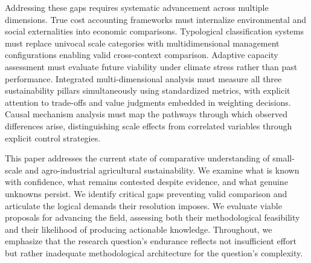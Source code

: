 \documentclass[12pt, a4paper]{article}
\begin{document}
Addressing these gaps requires systematic advancement across multiple dimensions. True cost accounting frameworks must internalize environmental and social externalities into economic comparisons. Typological classification systems must replace univocal scale categories with multidimensional management configurations enabling valid cross-context comparison. Adaptive capacity assessment must evaluate future viability under climate stress rather than past performance. Integrated multi-dimensional analysis must measure all three sustainability pillars simultaneously using standardized metrics, with explicit attention to trade-offs and value judgments embedded in weighting decisions. Causal mechanism analysis must map the pathways through which observed differences arise, distinguishing scale effects from correlated variables through explicit control strategies.

This paper addresses the current state of comparative understanding of small-scale and agro-industrial agricultural sustainability. We examine what is known with confidence, what remains contested despite evidence, and what genuine unknowns persist. We identify critical gaps preventing valid comparison and articulate the logical demands their resolution imposes. We evaluate viable proposals for advancing the field, assessing both their methodological feasibility and their likelihood of producing actionable knowledge. Throughout, we emphasize that the research question's endurance reflects not insufficient effort but rather inadequate methodological architecture for the question's complexity.
\end{document}
